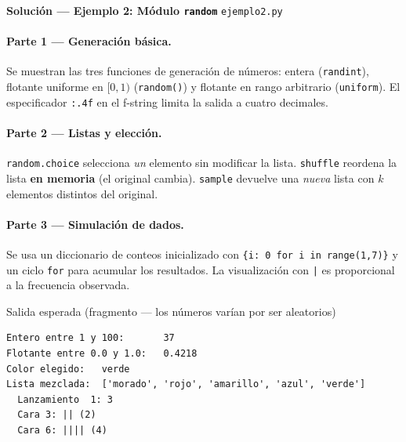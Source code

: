 \documentclass[12pt,a4paper]{article}
\begin{document}
\newpage
\begin{solucionbanner}
  {\large\bfseries\color{solColor} Solución — Ejemplo 2: Módulo \texttt{random}}
  \hfill \texttt{ejemplo2.py}
\end{solucionbanner}

\vspace{0.8em}


\vspace{0.8em}
\paragraph{Parte 1 — Generación básica.}
Se muestran las tres funciones de generación de números: entera (\texttt{randint}),
flotante uniforme en $[0,1)$ (\texttt{random()}) y flotante en rango arbitrario
(\texttt{uniform}).  El especificador \texttt{:.4f} en el f-string limita la salida
a cuatro decimales.

\paragraph{Parte 2 — Listas y elección.}
\texttt{random.choice} selecciona \emph{un} elemento sin modificar la lista.
\texttt{shuffle} reordena la lista \textbf{en memoria} (el original cambia).
\texttt{sample} devuelve una \emph{nueva} lista con $k$ elementos distintos del original.

\paragraph{Parte 3 — Simulación de dados.}
Se usa un diccionario de conteos inicializado con \texttt{\{i: 0 for i in range(1,7)\}}
y un ciclo \texttt{for} para acumular los resultados. La visualización con \texttt{|} es
proporcional a la frecuencia observada.

\vspace{0.6em}
\begin{salidabox}{Salida esperada (fragmento — los números varían por ser aleatorios)}
\begin{lstlisting}[style=OutputStyle]
Entero entre 1 y 100:       37
Flotante entre 0.0 y 1.0:   0.4218
Color elegido:   verde
Lista mezclada:  ['morado', 'rojo', 'amarillo', 'azul', 'verde']
  Lanzamiento  1: 3
  Cara 3: || (2)
  Cara 6: |||| (4)
\end{lstlisting}
\end{salidabox}
\end{document}
